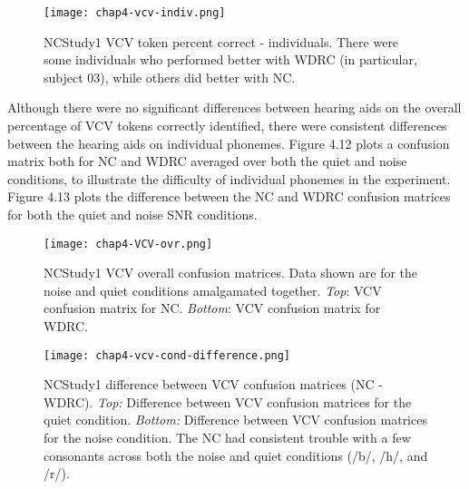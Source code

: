 \begin{figure}[htp]
\begin{center}
\texttt{[image: chap4-vcv-indiv.png]} \\
\caption[NCStudy1 VCV token percent correct - individuals]{NCStudy1 VCV token percent correct - individuals.  There were some individuals who performed better with WDRC (in particular, subject 03), while others did better with NC.}
\label{ch4-vcv-indiv}
\end{center}
\end{figure}

Although there were no significant differences between hearing aids on the overall percentage of VCV tokens correctly identified, there were consistent differences between the hearing aids on individual phonemes.  Figure 4.12 plots a confusion matrix both for NC and WDRC averaged over both the quiet and noise conditions, to illustrate the difficulty of individual phonemes in the experiment.  Figure 4.13 plots the difference between the NC and WDRC confusion matrices for both the quiet and noise SNR conditions.

\begin{figure}[htp]
\begin{center}
\texttt{[image: chap4-VCV-ovr.png]} \\
\caption[NCStudy1 VCV overall confusion matrices]{NCStudy1 VCV overall confusion matrices.  Data shown are for the noise and quiet conditions amalgamated together.  \emph{Top}: VCV confusion matrix for NC.  \emph{Bottom}: VCV confusion matrix for WDRC.}
\label{ch4-VCV-ovr}
\end{center}
\end{figure}

\clearpage

\begin{figure}[htp]
\begin{center}
\texttt{[image: chap4-vcv-cond-difference.png]} \\
\caption[NCStudy1 difference between VCV confusion matrices (NC - WDRC) ]{NCStudy1 difference between VCV confusion matrices (NC - WDRC).  \emph{Top:} Difference between VCV confusion matrices for the quiet condition.  \emph{Bottom:} Difference between VCV confusion matrices for the noise condition.  The NC had consistent trouble with a few consonants across both the noise and quiet conditions (/b/, /h/, and /r/).}
\label{ch4-VCV-cond-diff}
\end{center}
\end{figure}



